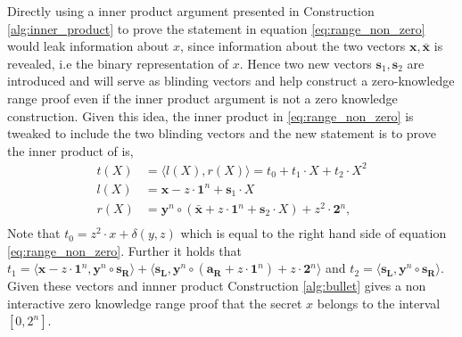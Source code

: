 Directly using  a inner product argument presented in Construction \ref{alg:inner_product} to prove the statement  in equation \eqref{eq:range_non_zero} would leak information about $x$, since information about the two vectors $\bm{x},\bm{\bar{x}}$ is revealed, i.e the binary representation of $x$. Hence two new vectors $\bm{s}_1,\bm{s}_2$ are introduced and will serve as blinding vectors and help construct a zero-knowledge range proof even if the inner product argument is not a zero knowledge construction. Given this idea, the inner product in \eqref{eq:range_non_zero} is tweaked to include the two blinding vectors and the new statement is to prove the inner product of is,
\begin{align*}
     t(X) &= \langle  l(X),r(X)\rangle = t_0 + t_1\cdot X + t_2\cdot X^2\\
    l(X) &= \bm{x} -z\cdot \bm{1}^n +\bm{s}_1\cdot X\\
    r(X) &= \bm{y}^n\circ (\bm{\bar{x}} + z \cdot\bm{1}^n + \bm{s}_2\cdot X)+ z^2\cdot\bm{2}^n,\\
\end{align*}
Note that $t_0 = z^2 \cdot x + \delta(y,z)$ which is equal to the right hand side of equation \eqref{eq:range_non_zero}. Further it holds that $t_1 = \langle \bm{x}-z\cdot \bm{1}^n , \bm{y}^n\circ \bm{s_R}\rangle + \langle\bm{s_L},\bm{y}^n\circ (\bm{a_R}+z\cdot\bm{1}^n) + z\cdot \bm{2}^n\rangle$ and $t_2 =\langle \bm{s_L}, \bm{y}^n \circ \bm{s_R}\rangle $. Given these vectors and innner product Construction \ref{alg:bullet} gives a non interactive zero knowledge range proof that the secret $x$ belongs to the interval $[0,2^n]$.

